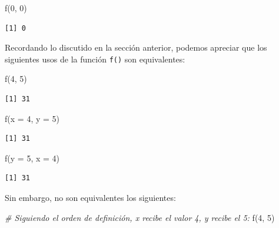 \documentclass[
]{book}
\newenvironment{Shaded}{\begin{snugshade}}{\end{snugshade}}
\newcommand{\AttributeTok}[1]{\textcolor[rgb]{0.77,0.63,0.00}{#1}}
\newcommand{\CommentTok}[1]{\textcolor[rgb]{0.56,0.35,0.01}{\textit{#1}}}
\newcommand{\DecValTok}[1]{\textcolor[rgb]{0.00,0.00,0.81}{#1}}
\newcommand{\FunctionTok}[1]{\textcolor[rgb]{0.00,0.00,0.00}{#1}}
\newcommand{\NormalTok}[1]{#1}
\begin{document}
\begin{Shaded}
\begin{Highlighting}[]
\FunctionTok{f}\NormalTok{(}\DecValTok{0}\NormalTok{, }\DecValTok{0}\NormalTok{)}
\end{Highlighting}
\end{Shaded}

\begin{verbatim}
[1] 0
\end{verbatim}

Recordando lo discutido en la sección anterior, podemos apreciar que los siguientes usos de la función \texttt{f()} son equivalentes:

\begin{Shaded}
\begin{Highlighting}[]
\FunctionTok{f}\NormalTok{(}\DecValTok{4}\NormalTok{, }\DecValTok{5}\NormalTok{)}
\end{Highlighting}
\end{Shaded}

\begin{verbatim}
[1] 31
\end{verbatim}

\begin{Shaded}
\begin{Highlighting}[]
\FunctionTok{f}\NormalTok{(}\AttributeTok{x =} \DecValTok{4}\NormalTok{, }\AttributeTok{y =} \DecValTok{5}\NormalTok{)}
\end{Highlighting}
\end{Shaded}

\begin{verbatim}
[1] 31
\end{verbatim}

\begin{Shaded}
\begin{Highlighting}[]
\FunctionTok{f}\NormalTok{(}\AttributeTok{y =} \DecValTok{5}\NormalTok{, }\AttributeTok{x =} \DecValTok{4}\NormalTok{)}
\end{Highlighting}
\end{Shaded}

\begin{verbatim}
[1] 31
\end{verbatim}

Sin embargo, no son equivalentes los siguientes:

\begin{Shaded}
\begin{Highlighting}[]
\CommentTok{\# Siguiendo el orden de definición, x recibe el valor 4, y recibe el 5:}
\FunctionTok{f}\NormalTok{(}\DecValTok{4}\NormalTok{, }\DecValTok{5}\NormalTok{)}
\end{Highlighting}
\end{Shaded}
\end{document}
